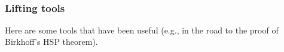 \begin{code}
\AgdaSpace{}%
\AgdaSpace{}%
\AgdaSpace{}%
\AgdaSpace{}%
\AgdaSpace{}%
\AgdaSpace{}%
\<%
\\
%
\>[1]\AgdaSpace{}%
\AgdaSpace{}%
\AgdaSymbol{=}\AgdaSpace{}%
\AgdaSpace{}%
\AgdaSpace{}%
\AgdaSpace{}%
\AgdaSymbol{(}\AgdaSpace{}%
\AgdaSpace{}%
\AgdaSymbol{)}\AgdaSpace{}%
\AgdaFunction{,}\AgdaSpace{}%
\AgdaSymbol{(}\AgdaSpace{}%
\AgdaSpace{}%
\AgdaSymbol{)}\<%
\end{code}
\ccpad
\subsubsection{Lifting tools}\label{lifting-tools}

Here are some tools that have been useful (e.g., in the road to the proof of Birkhoff's HSP theorem).


